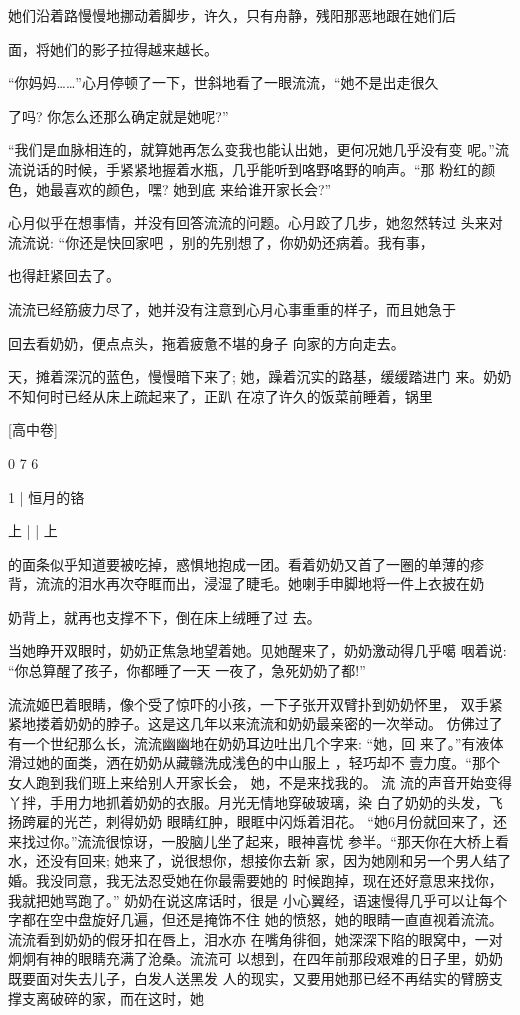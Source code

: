 \documentclass{article}
\begin{document}
她们沿着路慢慢地挪动着脚步，许久，只有舟静，残阳那恶地跟在她们后
\newpage


面，将她们的影子拉得越来越长。 

“你妈妈……”心月停顿了一下，世斜地看了一眼流流，“她不是出走很久

了吗? 你怎么还那么确定就是她呢?” 

“我们是血脉相连的，就算她再怎么变我也能认出她，更何况她几乎没有变
呢。”流流说话的时候，手紧紧地握着水瓶，几乎能听到咯野咯野的响声。“那
粉红的颜色，她最喜欢的颜色，嘿? 她到底
来给谁开家长会?” 

心月似乎在想事情，并没有回答流流的问题。心月跤了几步，她忽然转过
头来对流流说: “你还是快回家吧 ，别的先别想了，你奶奶还病着。我有事，

也得赶紧回去了。 

流流已经筋疲力尽了，她并没有注意到心月心事重重的样子，而且她急于
\newpage

回去看奶奶，便点点头，拖着疲惫不堪的身子
向家的方向走去。 

天，摊着深沉的蓝色，慢慢暗下来了; 她，躁着沉实的路基，缓缓踏进门
来。奶奶不知何时已经从床上疏起来了，正趴
在凉了许久的饭菜前睡着，锅里 


[高中卷] 


0 7 6 


1 |                    恒月的铬

上 | | 上 

的面条似乎知道要被吃掉，惑惧地抱成一团。看着奶奶又首了一圈的单薄的疹
背，流流的泪水再次夺眶而出，浸湿了睫毛。她喇手申脚地将一件上衣披在奶
\newpage

奶背上，就再也支撑不下，倒在床上绒睡了过
去。 

当她睁开双眼时，奶奶正焦急地望着她。见她醒来了，奶奶激动得几乎噶
咽着说: “你总算醒了孩子，你都睡了一天
一夜了，急死奶奶了都!” 

流流姬巴着眼睛，像个受了惊吓的小孩，一下子张开双臂扑到奶奶怀里，
双手紧紧地搂着奶奶的脖子。这是这几年以来流流和奶奶最亲密的一次举动。
仿佛过了有一个世纪那么长，流流幽幽地在奶奶耳边吐出几个字来: “她，回
来了。”有液体滑过她的面类，洒在奶奶从藏赣洗成浅色的中山服上 ，轻巧却不
壹力度。“那个女人跑到我们班上来给别人开家长会， 她，不是来找我的。 流
流的声音开始变得丫拌，手用力地抓着奶奶的衣服。月光无情地穿破玻璃，染
白了奶奶的头发，飞扬跨雇的光芒，刺得奶奶
\newpage
眼睛红肿，眼眶中闪烁着泪花。
“她6月份就回来了，还来找过你。”流流很惊讶，一股脑儿坐了起来，眼神喜忧
参半。“那天你在大桥上看水，还没有回来; 她来了，说很想你，想接你去新
家，因为她刚和另一个男人结了婚。我没同意，我无法忍受她在你最需要她的
时候跑掉，现在还好意思来找你，我就把她骂跑了。” 奶奶在说这席话时，很是
小心翼经，语速慢得几乎可以让每个字都在空中盘旋好几遍，但还是掩饰不住
她的愤怒，她的眼睛一直直视着流流。流流看到奶奶的假牙扣在唇上，泪水亦
在嘴角徘徊，她深深下陷的眼窝中，一对炯炯有神的眼睛充满了沧桑。流流可
以想到，在四年前那段艰难的日子里，奶奶既要面对失去儿子，白发人送黑发
人的现实，又要用她那已经不再结实的臂膀支撑支离破碎的家，而在这时，她
\end{document}
